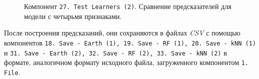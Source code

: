 \begin{figure}[H]
    \caption{Компонент \texttt{27.\,Test~Learners~(2)}. Сравнение предсказателей для модели с четырьмя признаками.}
    \label{img:27-Test-Learners-2}
\end{figure}

После построения предсказаний, они сохраняются в файлах \textit{CSV} с помощью компонентов \texttt{18.\,Save - Earth~(1), 19.\,Save - RF~(1), 20.\,Save - kNN~(1)} и \texttt{31.\,Save - Earth~(2), 32.\,Save - RF~(2), 33.\,Save - kNN~(2)} в формате, аналогичном формату исходного файла, загруженного компонентом \texttt{1.\,File}.
